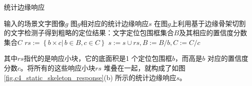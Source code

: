         \begin{algorithm} \renewcommand{\algorithmicrequire}{\textbf{输入:}}	\renewcommand{\algorithmicensure}{\textbf{输出:}}
    	\caption{统计边缘响应}
    	\label{alg:c4_static_skeleton_response}
    	\begin{algorithmic}[1]
    		\REQUIRE 输入的场景文字图像$g$
    		\ENSURE 图$g$相对应的统计边缘响应$s$
            \STATE 在图$g$上利用基于边缘骨架切割的文字检测子得到粗略的定位结果：文字定位包围框集合$B$及其相应的置信度分数集合$C$
    		\REPEAT
            \STATE $rs:=\left\{ b \times c  |\,b \in B, c \in C\right\}$
            \STATE $s:=s\cup rs,B:=B / b,C:=C / c$
    	\end{algorithmic}
        \end{algorithm}

        其中$rs$指代的是响应小块，它的底面积是1 个定位包围框$b$，而高是$b$ 对应的置信度分数$c$。将所有的这些响应小块$rs$ 堆叠在一起，就构成了如图\ref{fig.c4_static_skeleton_response}(b) 所示的统计边缘响应$s$。

